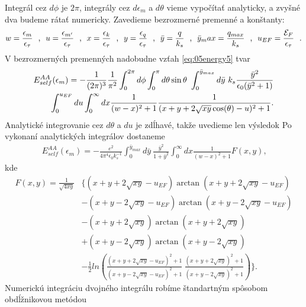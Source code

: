 Integrál cez $d\phi$ je $2\pi$, integrály cez $d\epsilon_m$ a $d\theta$ vieme vypočítať analyticky, a zvyšné dva budeme rátať numericky. Zavedieme bezrozmerné premenné a konštanty:
\begin{equation}
w=\frac{\epsilon_m}{\epsilon_\tau} \ \ \text{,} \ \
u=\frac{\epsilon_{m'}}{\epsilon_\tau} \ \ \text{,} \ \
x=\frac{\epsilon_k}{\epsilon_\tau} \ \ \text{,} \ \
y=\frac{\epsilon_q}{\epsilon_\tau} \ \ \text{,} \ \
\bar{y}=\frac{q}{k_s}  \ \   \text{,} \ \
\bar{y}_max=\frac{q_{max}}{k_s}  \ \ \text{,} \ \
u_{EF}=\frac{\E_F}{\epsilon_\tau}  \ \ \text{.}
\end{equation}
V bezrozmerných premenných nadobudne vzťah \eqref{eq:05energy5} tvar
\begin{align}
\notag
E_{self}^{AA}(\epsilon_m)= - \frac{1}{(2\pi)^3}\frac{1}{\pi^2}\int_0^{2\pi}d\phi \int_0^\pi d\theta \sin\theta \ \int_0^{\bar{y}_{max}} d\bar{y}\ k_s \frac{\bar{y}^2}{\epsilon_0(\bar{y}^2+1)}\\
\int_0^{u_{EF}} du \int_0^{\infty} dx \frac{1}{(w-x)^2+1}\frac{1}{(x+y+2\sqrt{xy}\cos(\theta)-u)^2+1} \text{.}
\end{align}
Analytické integrovanie cez $d\theta$ a $du$ je zdĺhavé, takže uvedieme len výsledok Po vykonaní analytických integrálov dostaneme
\begin{align}
\label{eq:05energy6}
E_{self}^{AA}(\epsilon_m)= -\frac{e^2}{4\pi^4\epsilon_0 k_s^{-1}} \int_0^{\bar y_{max}} d\bar{y}\ \frac{\bar{y}^2}{1+\bar{y}^2}\int_0^{\infty} dx \frac{1}{(w-x)^2+1}F(x,y) \text{,}
\end{align}
kde
\begin{align*}
F(x,y)=\frac{1}{\sqrt{4xy}}& \{(x+y+2\sqrt{xy}-u_{EF})\arctan(x+y+2\sqrt{xy}-u_{EF}) \\
&-(x+y-2\sqrt{xy}-u_{EF})\arctan(x+y-2\sqrt{xy}-u_{EF}) \\
&-(x+y+2\sqrt{xy})\arctan(x+y+2\sqrt{xy}) \\
&+(x+y-2\sqrt{xy})\arctan(x+y-2\sqrt{xy}) \\
&-\frac{1}{2}ln(\frac{(x+y+2\sqrt{xy}-u_{EF})^2+1}{(x+y-2\sqrt{xy}-u_{EF})^2+1}\ \frac{(x+y+2\sqrt{xy})^2+1}{(x+y-2\sqrt{xy})^2+1})\}\text{.}
\end{align*}
Numerickú integráciu dvojného integrálu robíme štandartným spôsobom obdĺžnikovou metódou

